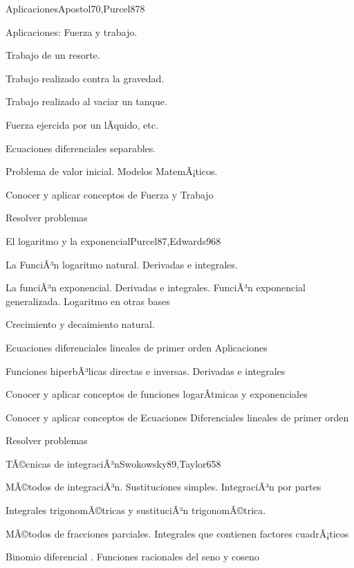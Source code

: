 \begin{syllabus}
\begin{unit}{Aplicaciones}{Apostol70,Purcel87}{8}
\begin{topics}
      \item Aplicaciones: Fuerza y trabajo. 
      \item Trabajo de un resorte. 
      \item Trabajo realizado contra la gravedad. 
      \item Trabajo realizado al vaciar un tanque. 
      \item Fuerza ejercida por un lÃ­quido, etc.
      \item Ecuaciones diferenciales separables. 
      \item Problema de valor inicial. Modelos MatemÃ¡ticos.
\end{topics}

\begin{unitgoals}
	\item Conocer y aplicar conceptos de Fuerza y Trabajo
	\item Resolver problemas
\end{unitgoals}
\end{unit}

\begin{unit}{El logaritmo y la exponencial}{Purcel87,Edwards96}{8}
\begin{topics}
	\item La FunciÃ³n logaritmo natural. Derivadas e integrales.
	\item La funciÃ³n exponencial. Derivadas e integrales. FunciÃ³n exponencial  generalizada. Logaritmo en otras bases
	\item Crecimiento y decaimiento natural. 
	\item Ecuaciones diferenciales lineales de primer orden Aplicaciones
	\item Funciones hiperbÃ³licas directas e inversas. Derivadas e integrales
\end{topics}

\begin{unitgoals}
	\item Conocer y aplicar conceptos de funciones logarÃ­tmicas y exponenciales
	\item Conocer y aplicar conceptos de Ecuaciones Diferenciales lineales de primer orden
	\item Resolver problemas
\end{unitgoals}
\end{unit}

\begin{unit}{TÃ©cnicas de integraciÃ³n}{Swokowsky89,Taylor65}{8}
\begin{topics}
	\item MÃ©todos de integraciÃ³n. Sustituciones simples. IntegraciÃ³n por partes
	\item Integrales trigonomÃ©tricas y sustituciÃ³n trigonomÃ©trica.
	\item MÃ©todos de fracciones parciales. Integrales que contienen factores  cuadrÃ¡ticos
	\item Binomio diferencial . Funciones racionales del seno y coseno
\end{topics}


\end{unit}
\end{syllabus}
